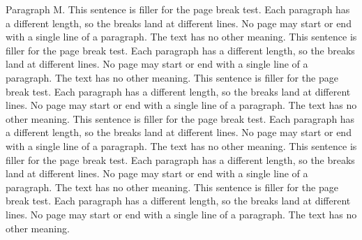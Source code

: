 Paragraph M. This sentence is filler for the page break test. Each paragraph
has a different length, so the breaks land at different lines. No page may
start or end with a single line of a paragraph. The text has no other meaning.
This sentence is filler for the page break test. Each paragraph has a
different length, so the breaks land at different lines. No page may start or
end with a single line of a paragraph. The text has no other meaning. This
sentence is filler for the page break test. Each paragraph has a different
length, so the breaks land at different lines. No page may start or end with a
single line of a paragraph. The text has no other meaning. This sentence is
filler for the page break test. Each paragraph has a different length, so the
breaks land at different lines. No page may start or end with a single line of
a paragraph. The text has no other meaning. This sentence is filler for the
page break test. Each paragraph has a different length, so the breaks land at
different lines. No page may start or end with a single line of a paragraph.
The text has no other meaning. This sentence is filler for the page break
test. Each paragraph has a different length, so the breaks land at different
lines. No page may start or end with a single line of a paragraph. The text
has no other meaning.
